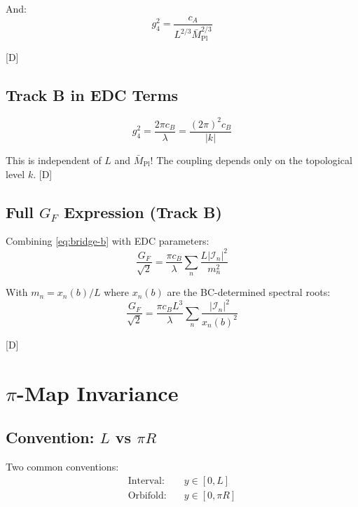 \documentclass[11pt,a4paper]{article}
\newcommand{\tagD}{\textcolor{blue!70!black}{[D]}}
\begin{document}
And:
\begin{equation}
\label{eq:g4-track-a-edc}
g_4^2 = \frac{c_A}{L^{2/3} \bar{M}_{\text{Pl}}^{2/3}}
\end{equation}

\tagD

\subsection{Track B in EDC Terms}

\begin{equation}
\label{eq:track-b-edc}
g_4^2 = \frac{2\pi c_B}{\lambda} = \frac{(2\pi)^2 c_B}{|k|}
\end{equation}

This is independent of $L$ and $\bar{M}_{\text{Pl}}$! The coupling depends only
on the topological level $k$. \tagD

\subsection{Full $G_F$ Expression (Track B)}

Combining \eqref{eq:bridge-b} with EDC parameters:
\begin{equation}
\label{eq:GF-track-b-full}
\frac{G_F}{\sqrt{2}} = \frac{\pi c_B}{\lambda} \sum_n \frac{L |\mathcal{I}_n|^2}{m_n^2}
\end{equation}

With $m_n = x_n(b)/L$ where $x_n(b)$ are the BC-determined spectral roots:
\begin{equation}
\label{eq:GF-track-b-spectral}
\frac{G_F}{\sqrt{2}} = \frac{\pi c_B L^3}{\lambda} \sum_n \frac{|\mathcal{I}_n|^2}{x_n(b)^2}
\end{equation}

\tagD

\section{$\pi$-Map Invariance}

\subsection{Convention: $L$ vs $\pi R$}

Two common conventions:
\begin{align}
\label{eq:conv-L}
\text{Interval:} \quad & y \in [0, L] \\
\label{eq:conv-piR}
\text{Orbifold:} \quad & y \in [0, \pi R]
\end{align}
\end{document}
